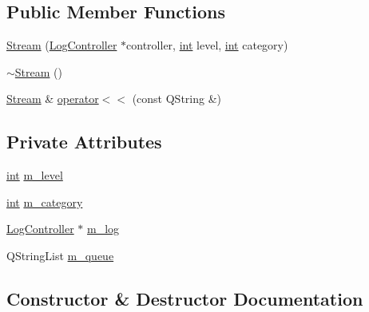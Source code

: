 \subsection*{Public Member Functions}
\begin{DoxyCompactItemize}
\item 
\mbox{\hyperlink{class_q_g_b_a_1_1_log_controller_1_1_stream_aa366f873bedc7cfbd0449daf8d220be5}{Stream}} (\mbox{\hyperlink{class_q_g_b_a_1_1_log_controller}{Log\+Controller}} $\ast$controller, \mbox{\hyperlink{ioapi_8h_a787fa3cf048117ba7123753c1e74fcd6}{int}} level, \mbox{\hyperlink{ioapi_8h_a787fa3cf048117ba7123753c1e74fcd6}{int}} category)
\item 
\mbox{\hyperlink{class_q_g_b_a_1_1_log_controller_1_1_stream_a965239c87dc75d52b61873207616c9a2}{$\sim$\+Stream}} ()
\item 
\mbox{\hyperlink{class_q_g_b_a_1_1_log_controller_1_1_stream}{Stream}} \& \mbox{\hyperlink{class_q_g_b_a_1_1_log_controller_1_1_stream_ac0bc784e5eec1ee95e3424a51c0ed7ff}{operator$<$$<$}} (const Q\+String \&)
\end{DoxyCompactItemize}
\subsection*{Private Attributes}
\begin{DoxyCompactItemize}
\item 
\mbox{\hyperlink{ioapi_8h_a787fa3cf048117ba7123753c1e74fcd6}{int}} \mbox{\hyperlink{class_q_g_b_a_1_1_log_controller_1_1_stream_a7c59f85ce8d047657577bdee27b790d8}{m\+\_\+level}}
\item 
\mbox{\hyperlink{ioapi_8h_a787fa3cf048117ba7123753c1e74fcd6}{int}} \mbox{\hyperlink{class_q_g_b_a_1_1_log_controller_1_1_stream_afb1ac3138142de03ae8bf73d425e56fd}{m\+\_\+category}}
\item 
\mbox{\hyperlink{class_q_g_b_a_1_1_log_controller}{Log\+Controller}} $\ast$ \mbox{\hyperlink{class_q_g_b_a_1_1_log_controller_1_1_stream_a13b9b14ad07e2adf327e987c2b0f3af9}{m\+\_\+log}}
\item 
Q\+String\+List \mbox{\hyperlink{class_q_g_b_a_1_1_log_controller_1_1_stream_a29e088e1e72dccd1ef9ba34f8dc407b3}{m\+\_\+queue}}
\end{DoxyCompactItemize}


\subsection{Constructor \& Destructor Documentation}
\mbox{\label{class_q_g_b_a_1_1_log_controller_1_1_stream_aa366f873bedc7cfbd0449daf8d220be5}} 
